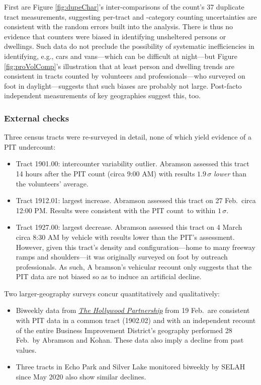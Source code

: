 \documentclass[11pt,twocolumn]{article}
\def\Count{count}
\begin{document}
First are Figure \ref{fig:dupeChar}'s inter-comparisons of the count's 37 duplicate tract 
measurements, suggesting per-tract and -category counting uncertainties are consistent with  
the random errors built into the analysis. There is thus no evidence that counters were biased in
identifying unsheltered persons or dwellings. Such data do not preclude the possibility of systematic 
inefficiencies in identifying, e.g., cars and vans---which can be difficult at night---but 
Figure \ref{fig:proVolComp}'s illustration that at least person and dwelling trends are consistent 
in tracts counted by volunteers and professionals---who surveyed on foot in daylight---suggests 
that such biases are probably not large. Post-facto independent measurements of key geographies
suggest this, too.

\subsubsection{External checks}

Three census tracts were re-surveyed in detail, none of which yield evidence of a PIT undercount:
\begin{itemize}
	\item Tract 1901.00: intercounter variability outlier. Abramson
		  assessed this tract 14 hours after the PIT count (circa 9:00 AM) with results 
		  $1.9\,\sigma$ {\it lower} than the volunteers' average.
	\item Tract 1912.01: largest increase. Abramson assessed this tract on 
		27 Feb.\ circa 12:00 PM. Results were consistent with the PIT \Count\ to within 
		$1\,\sigma$.
	\item Tract 1927.00: largest decrease. Abramson assessed this tract
		on 4 March circa 8:30 AM by vehicle with results lower than the PIT's assessment. 
		However, given this tract's density and configuration---home to many freeway ramps and
		shoulders---it was originally surveyed on foot by outreach professionals. As such, A bramson's 
		vehicular recount only suggests that the PIT data are not biased so as to induce an artificial decline.
\end{itemize}

Two larger-geography surveys concur quantitatively and qualitatively:
\begin{itemize}
	\item Biweekly data from \href{https://hollywoodpartnership.com/}{\it The Hollywood Partnership} 
		from 19 Feb.\ are consistent with PIT data in a common tract (1902.02) and with an independent 
		recount of the entire Business Improvement District's geography performed 28 Feb.\ by Abramson and 
		Kohan. These data also imply a decline from past values.
	\item Three tracts in Echo Park and Silver Lake monitored biweekly by SELAH since May 2020 
		also show similar declines. 
\end{itemize}
%
%
\end{document}
